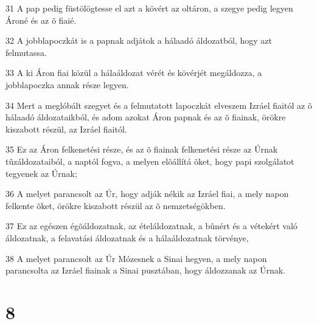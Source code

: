 \par 31 A pap pedig füstölögtesse el azt a kövért az oltáron, a szegye pedig legyen Ároné és az õ fiaié.
\par 32 A jobblapoczkát is a papnak adjátok a hálaadó áldozatból, hogy azt felmutassa.
\par 33 A ki Áron fiai közül a hálaáldozat vérét és kövérjét megáldozza, a jobblapoczka annak része legyen.
\par 34 Mert a meglóbált szegyet és a felmutatott lapoczkát elveszem Izráel fiaitól az õ hálaadó áldozataikból, és adom azokat Áron papnak és az õ fiainak, örökre kiszabott részül, az Izráel fiaitól.
\par 35 Ez az Áron felkenetési része, és az õ fiainak felkenetési része az Úrnak tûzáldozataiból, a naptól fogva, a melyen elõállítá õket, hogy papi szolgálatot tegyenek az Úrnak;
\par 36 A melyet parancsolt az Úr, hogy adják nékik az Izráel fiai, a mely napon felkente õket, örökre kiszabott részül az õ nemzetségökben.
\par 37 Ez az egészen égõáldozatnak, az ételáldozatnak, a bûnért és a vétekért való áldozatnak, a felavatási áldozatnak és a hálaáldozatnak törvénye,
\par 38 A melyet parancsolt az Úr Mózesnek a Sinai hegyen, a mely napon parancsolta az Izráel fiainak a Sinai pusztában, hogy áldozzanak az Úrnak.

\chapter{8}

